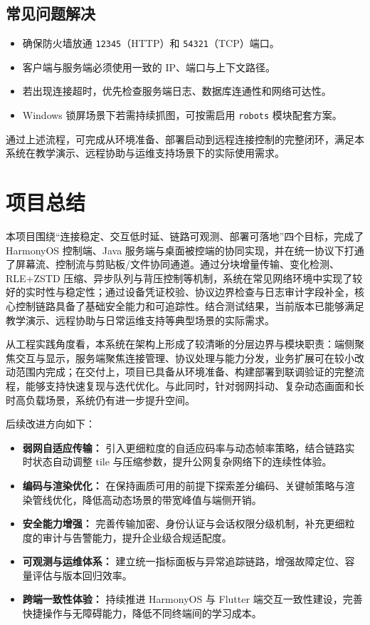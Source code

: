 \documentclass[UTF8,fontset=none]{ctexart}
\begin{document}
\subsection{常见问题解决}
\begin{itemize}
	\item 确保防火墙放通 \texttt{12345}（HTTP）和 \texttt{54321}（TCP）端口。
	\item 客户端与服务端必须使用一致的 IP、端口与上下文路径。
	\item 若出现连接超时，优先检查服务端日志、数据库连通性和网络可达性。
	\item Windows 锁屏场景下若需持续抓图，可按需启用 \texttt{robots} 模块配套方案。
\end{itemize}

通过上述流程，可完成从环境准备、部署启动到远程连接控制的完整闭环，满足本系统在教学演示、远程协助与运维支持场景下的实际使用需求。

\newpage
\section{项目总结}
本项目围绕“连接稳定、交互低时延、链路可观测、部署可落地”四个目标，完成了 HarmonyOS 控制端、Java 服务端与桌面被控端的协同实现，并在统一协议下打通了屏幕流、控制流与剪贴板/文件协同通道。通过分块增量传输、变化检测、RLE+ZSTD 压缩、异步队列与背压控制等机制，系统在常见网络环境中实现了较好的实时性与稳定性；通过设备凭证校验、协议边界检查与日志审计字段补全，核心控制链路具备了基础安全能力和可追踪性。结合测试结果，当前版本已能够满足教学演示、远程协助与日常运维支持等典型场景的实际需求。

从工程实践角度看，本系统在架构上形成了较清晰的分层边界与模块职责：端侧聚焦交互与显示，服务端聚焦连接管理、协议处理与能力分发，业务扩展可在较小改动范围内完成；在交付上，项目已具备从环境准备、构建部署到联调验证的完整流程，能够支持快速复现与迭代优化。与此同时，针对弱网抖动、复杂动态画面和长时高负载场景，系统仍有进一步提升空间。

后续改进方向如下：
\begin{itemize}
\item \textbf{弱网自适应传输：} 引入更细粒度的自适应码率与动态帧率策略，结合链路实时状态自动调整 tile 与压缩参数，提升公网复杂网络下的连续性体验。
\item \textbf{编码与渲染优化：} 在保持画质可用的前提下探索差分编码、关键帧策略与渲染管线优化，降低高动态场景的带宽峰值与端侧开销。
\item \textbf{安全能力增强：} 完善传输加密、身份认证与会话权限分级机制，补充更细粒度的审计与告警能力，提升企业级合规适配度。
\item \textbf{可观测与运维体系：} 建立统一指标面板与异常追踪链路，增强故障定位、容量评估与版本回归效率。
\item \textbf{跨端一致性体验：} 持续推进 HarmonyOS 与 Flutter 端交互一致性建设，完善快捷操作与无障碍能力，降低不同终端间的学习成本。
\end{itemize}
\end{document}
